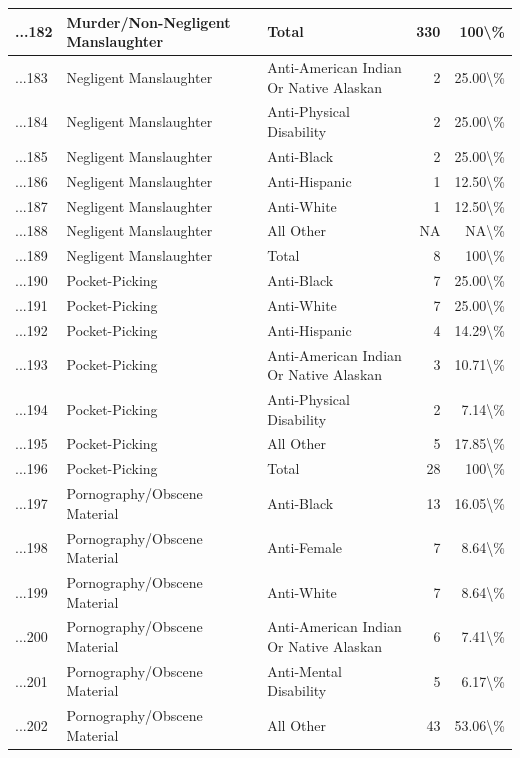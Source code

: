 \documentclass[
]{krantz}
\begin{document}
\begin{longtable}[t]{l|l|l|r|r}
\hline
...182 & Murder/Non-Negligent Manslaughter & Total & 330 & 100\textbackslash{}\%\\
\hline
...183 & Negligent Manslaughter & Anti-American Indian Or Native Alaskan & 2 & 25.00\textbackslash{}\%\\
\hline
...184 & Negligent Manslaughter & Anti-Physical Disability & 2 & 25.00\textbackslash{}\%\\
\hline
...185 & Negligent Manslaughter & Anti-Black & 2 & 25.00\textbackslash{}\%\\
\hline
...186 & Negligent Manslaughter & Anti-Hispanic & 1 & 12.50\textbackslash{}\%\\
\hline
...187 & Negligent Manslaughter & Anti-White & 1 & 12.50\textbackslash{}\%\\
\hline
...188 & Negligent Manslaughter & All Other & NA & NA\textbackslash{}\%\\
\hline
...189 & Negligent Manslaughter & Total & 8 & 100\textbackslash{}\%\\
\hline
...190 & Pocket-Picking & Anti-Black & 7 & 25.00\textbackslash{}\%\\
\hline
...191 & Pocket-Picking & Anti-White & 7 & 25.00\textbackslash{}\%\\
\hline
...192 & Pocket-Picking & Anti-Hispanic & 4 & 14.29\textbackslash{}\%\\
\hline
...193 & Pocket-Picking & Anti-American Indian Or Native Alaskan & 3 & 10.71\textbackslash{}\%\\
\hline
...194 & Pocket-Picking & Anti-Physical Disability & 2 & 7.14\textbackslash{}\%\\
\hline
...195 & Pocket-Picking & All Other & 5 & 17.85\textbackslash{}\%\\
\hline
...196 & Pocket-Picking & Total & 28 & 100\textbackslash{}\%\\
\hline
...197 & Pornography/Obscene Material & Anti-Black & 13 & 16.05\textbackslash{}\%\\
\hline
...198 & Pornography/Obscene Material & Anti-Female & 7 & 8.64\textbackslash{}\%\\
\hline
...199 & Pornography/Obscene Material & Anti-White & 7 & 8.64\textbackslash{}\%\\
\hline
...200 & Pornography/Obscene Material & Anti-American Indian Or Native Alaskan & 6 & 7.41\textbackslash{}\%\\
\hline
...201 & Pornography/Obscene Material & Anti-Mental Disability & 5 & 6.17\textbackslash{}\%\\
\hline
...202 & Pornography/Obscene Material & All Other & 43 & 53.06\textbackslash{}\%\\

\end{longtable}
\end{document}
